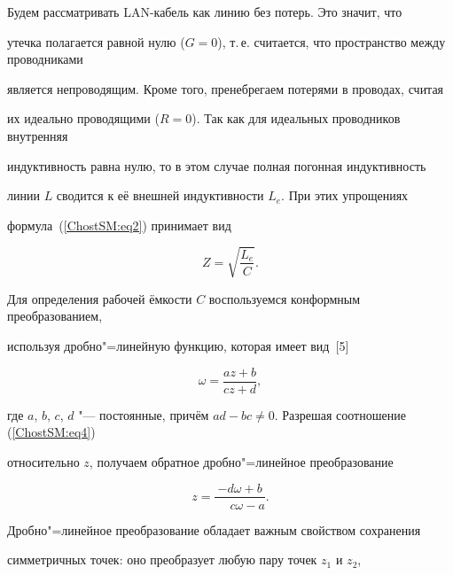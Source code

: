 Будем рассматривать LAN-кабель как линию без потерь. Это значит, что 

утечка полагается равной нулю ($G=0$), т.\,е. считается, что пространство между проводниками 

является непроводящим. Кроме того, пренебрегаем потерями в проводах, считая 

их идеально проводящими ($R=0$). Так как для идеальных проводников внутренняя 

индуктивность равна нулю, то в этом случае полная погонная индуктивность 

линии $L$ сводится к её внешней индуктивности $L_{e}$. При этих упрощениях 

формула~(\ref{ChostSM:eq2}) принимает вид

\begin{equation}

\label{ChostSM:eq3}

Z = \sqrt {\frac{L_e }{C}} .

\end{equation}



Для определения рабочей ёмкости $C$ воспользуемся конформным преобразованием, 

используя дробно"=линейную функцию, которая имеет вид~[5]

\begin{equation}

\label{ChostSM:eq4}

\omega = \frac{az + b}{cz + d},

\end{equation}

где $a$, $b$, $c$, $d$ "--- постоянные, причём $ad - bc \ne 0$. Разрешая соотношение (\ref{ChostSM:eq4}) 

относительно $z$, получаем обратное дробно"=линейное преобразование

\begin{equation}

\label{ChostSM:eq5}

z = \frac{ - d\omega + b}{\phantom{-}c\omega - a}.

\end{equation}







Дробно"=линейное преобразование обладает важным свойством сохранения 

симметричных точек: оно преобразует любую пару точек $z_{1}$ и $z_{2}$, 

